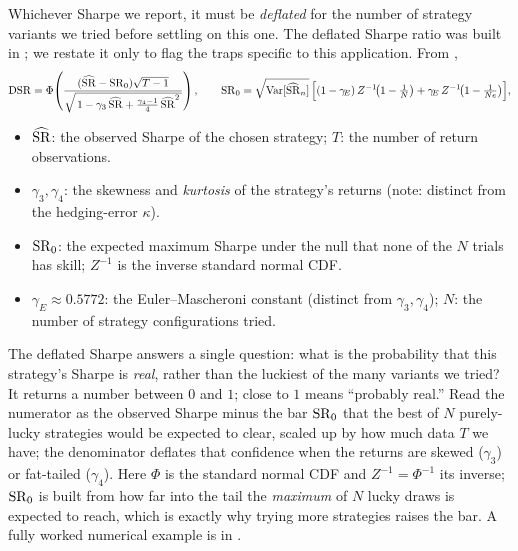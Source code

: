 Whichever Sharpe we report, it must be \emph{deflated} for the number of strategy variants we tried before settling on this one. The deflated Sharpe ratio was built in ; we restate it only to flag the traps specific to this application. From ,
\begin{equation}
\label{eq:ivrv:dsr-restate}
\operatorname{DSR} = \Phi\!\left(\frac{(\widehat{\operatorname{SR}} - \operatorname{SR}_0)\sqrt{T-1}}{\sqrt{\,1 - \gamma_3\,\widehat{\operatorname{SR}} + \tfrac{\gamma_4 - 1}{4}\,\widehat{\operatorname{SR}}^2\,}}\right),
\qquad
\operatorname{SR}_0 = \sqrt{\operatorname{Var}[\widehat{\operatorname{SR}}_n]}\,\Big[(1-\gamma_{\!E})\,Z^{-1}\!\big(1 - \tfrac1N\big) + \gamma_{\!E}\,Z^{-1}\!\big(1 - \tfrac1{Ne}\big)\Big],
\end{equation}
\begin{itemize}
  \item $\widehat{\operatorname{SR}}$: the observed Sharpe of the chosen strategy; $T$: the number of return observations.
  \item $\gamma_3, \gamma_4$: the skewness and \emph{kurtosis} of the strategy's returns (note: distinct from the hedging-error $\kappa$).
  \item $\operatorname{SR}_0$: the expected maximum Sharpe under the null that none of the $N$ trials has skill; $Z^{-1}$ is the inverse standard normal CDF.
  \item $\gamma_{\!E} \approx 0.5772$: the Euler--Mascheroni constant (distinct from $\gamma_3, \gamma_4$); $N$: the number of strategy configurations tried.
\end{itemize}

\begin{intuition}
The deflated Sharpe answers a single question: what is the probability that this strategy's Sharpe is \emph{real}, rather than the luckiest of the many variants we tried? It returns a number between $0$ and $1$; close to $1$ means ``probably real.'' Read the numerator as the observed Sharpe minus the bar $\operatorname{SR}_0$ that the best of $N$ purely-lucky strategies would be expected to clear, scaled up by how much data $T$ we have; the denominator deflates that confidence when the returns are skewed ($\gamma_3$) or fat-tailed ($\gamma_4$). Here $\Phi$ is the standard normal CDF and $Z^{-1} = \Phi^{-1}$ its inverse; $\operatorname{SR}_0$ is built from how far into the tail the \emph{maximum} of $N$ lucky draws is expected to reach, which is exactly why trying more strategies raises the bar. A fully worked numerical example is in .
\end{intuition}

